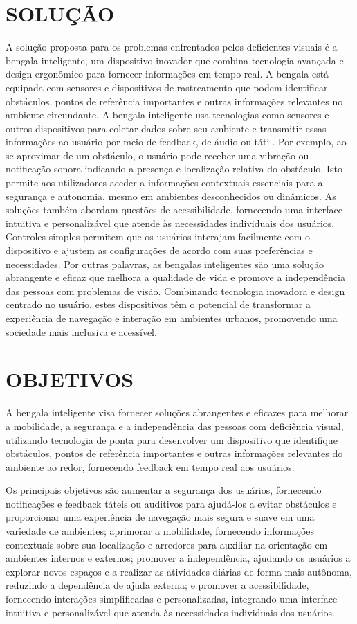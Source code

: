 \section{SOLUÇÃO}
A solução proposta para os problemas enfrentados pelos deficientes visuais é a bengala inteligente, um dispositivo inovador que combina tecnologia avançada e design ergonômico para fornecer informações em tempo real. A bengala está equipada com sensores e dispositivos de rastreamento que podem identificar obstáculos, pontos de referência importantes e outras informações relevantes no ambiente circundante.
A bengala inteligente usa tecnologias como sensores e outros dispositivos para coletar dados sobre seu ambiente e transmitir essas informações ao usuário por meio de feedback, de áudio ou tátil. Por exemplo, ao se aproximar de um obstáculo, o usuário pode receber uma vibração ou notificação sonora indicando a presença e localização relativa do obstáculo. Isto permite aos utilizadores aceder a informações contextuais essenciais para a segurança e autonomia, mesmo em ambientes desconhecidos ou dinâmicos.
As soluções também abordam questões de acessibilidade, fornecendo uma interface intuitiva e personalizável que atende às necessidades individuais dos usuários. Controles simples permitem que os usuários interajam facilmente com o dispositivo e ajustem as configurações de acordo com suas preferências e necessidades.
Por outras palavras, as bengalas inteligentes são uma solução abrangente e eficaz que melhora a qualidade de vida e promove a independência das pessoas com problemas de visão. Combinando tecnologia inovadora e design centrado no usuário, estes dispositivos têm o potencial de transformar a experiência de navegação e interação em ambientes urbanos, promovendo uma sociedade mais inclusiva e acessível.

\section{OBJETIVOS}

A bengala inteligente visa fornecer soluções abrangentes e eficazes para melhorar a mobilidade, a segurança e a independência das pessoas com deficiência visual, utilizando tecnologia de ponta para desenvolver um dispositivo que identifique obstáculos, pontos de referência importantes e outras informações relevantes do ambiente ao redor, fornecendo feedback em tempo real aos usuários.

Os principais objetivos são aumentar a segurança dos usuários, fornecendo notificações e feedback táteis ou auditivos para ajudá-los a evitar obstáculos e proporcionar uma experiência de navegação mais segura e suave em uma variedade de ambientes; aprimorar a mobilidade, fornecendo informações contextuais sobre sua localização e arredores para auxiliar na orientação em ambientes internos e externos; promover a independência, ajudando os usuários a explorar novos espaços e a realizar as atividades diárias de forma mais autônoma, reduzindo a dependência de ajuda externa; e promover a acessibilidade, fornecendo interações simplificadas e personalizadas, integrando uma interface intuitiva e personalizável que atenda às necessidades individuais dos usuários.

